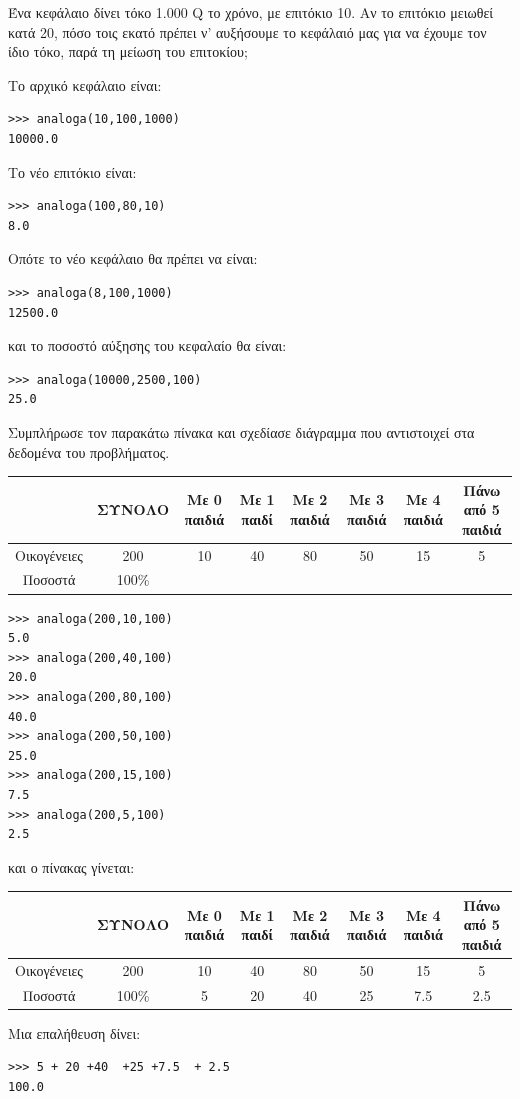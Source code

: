 \begin{exercise}
Ένα	κεφάλαιο	δίνει	τόκο	1.000	Q	το	χρόνο,	με	επιτόκιο	10.	Αν	το	επιτόκιο	μειωθεί	κατά	20,	πόσο	τοις	εκατό	πρέπει	ν’	αυξήσουμε	το	κεφάλαιό	μας	για	να	έχουμε	τον	ίδιο	τόκο,	παρά	τη	μείωση	του	επιτοκίου;
\end{exercise}
Το αρχικό κεφάλαιο είναι:
\begin{lstlisting}
>>> analoga(10,100,1000)
10000.0
\end{lstlisting}
Το νέο επιτόκιο είναι:
\begin{lstlisting}
>>> analoga(100,80,10)
8.0
\end{lstlisting}
Οπότε το νέο κεφάλαιο θα πρέπει να είναι:
\begin{lstlisting}
>>> analoga(8,100,1000)
12500.0
\end{lstlisting}
και το ποσοστό αύξησης του κεφαλαίο θα είναι:
\begin{lstlisting}
>>> analoga(10000,2500,100)
25.0
\end{lstlisting}
\begin{exercise}
 Συμπλήρωσε	τον	παρακάτω	πίνακα	και	σχεδίασε	διάγραμμα	που	αντιστοιχεί	στα	δεδομένα	του	προβλήματος.
\begin{table}
\begin{tabular}{|c|c|c|c|c|c|c|c|}\hline
 &ΣΥΝΟΛΟ & Με 0 παιδιά & Με 1 παιδί & Με 2 παιδιά & Με 3 παιδιά & Με 4 παιδιά & Πάνω από 5 παιδιά     \\\hline
Οικογένειες &200 & 10 & 40 & 80 & 50 & 15 & 5     \\\hline
Ποσοστά & 100\%& &  &  & &  &     \\\hline
\end{tabular}
\end{table}
\end{exercise}
\begin{lstlisting}
>>> analoga(200,10,100)
5.0
>>> analoga(200,40,100)
20.0
>>> analoga(200,80,100)
40.0
>>> analoga(200,50,100)
25.0
>>> analoga(200,15,100)
7.5
>>> analoga(200,5,100)
2.5
\end{lstlisting}
και ο πίνακας γίνεται:
\begin{table}
\begin{tabular}{|c|c|c|c|c|c|c|c|}\hline
 &ΣΥΝΟΛΟ & Με 0 παιδιά & Με 1 παιδί & Με 2 παιδιά & Με 3 παιδιά & Με 4 παιδιά & Πάνω από 5 παιδιά     \\\hline
Οικογένειες &200 & 10 & 40 & 80 & 50 & 15 & 5     \\\hline
Ποσοστά & 100\%&5 & 20 &40  &25 &7.5  & 2.5    \\\hline
\end{tabular}
\end{table}
Μια επαλήθευση δίνει:
\begin{lstlisting}
>>> 5 + 20 +40  +25 +7.5  + 2.5   
100.0
\end{lstlisting}